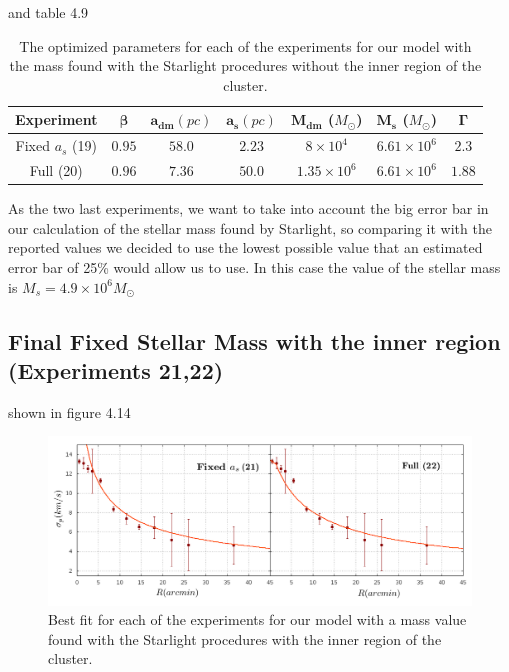 and table 4.9

\begin{table}[H]
\begin{center}
\begin{tabular}{| c| c| c| c| c| c| c|}
    \hline
    \textbf{Experiment} & $\mathbf{\beta}$ & $\mathbf{a_{dm}} (pc)$ & $\mathbf{a_{s}} (pc)$ & $\mathbf{M_{dm}}$ ($M_{\odot}$) & $\mathbf{M_{s}}$ ($M_{\odot}$) & $\mathbf{\Gamma}$\\ \hline
	Fixed $a_s$ (19) &	$0.95$ &	$58.0$ &	$2.23$ &	$8 \times 10^{4}$ &	$6.61 \times 10 ^{6}$ &	$2.3$\\ \hline
	Full (20) &	$0.96$ &	$7.36$ &	$50.0$ &	$1.35 \times 10^{6}$ &	$6.61 \times 10^{6}$ &	$1.88$\\ \hline
  \end{tabular} 
\caption[Optimized parameters for our model with the mass found with the Starlight procedures without the inner region.]{The optimized parameters for each of the experiments for our model with the mass found with the Starlight procedures without the inner region of the cluster.}
\end{center}
\end{table}


As the two last experiments, we want to take into account the big error bar in our calculation of the stellar mass found by Starlight, so comparing it with the reported values we decided to use the lowest possible value that an estimated error bar of 25\% would allow us to use. In this case the value of the stellar mass is $M_{s}=4.9 \times 10^{6} M_{\odot}$

\subsection{Final Fixed Stellar Mass with the inner region (Experiments 21,22)}

shown in figure 4.14

\begin{figure}[H]
\centering
\includegraphics[width=15cm]{images/Starlight_25_12.png}
\caption[Best fits for our model with a mass value based on the Starlight procedures with the inner region.]{Best fit for each of the experiments for our model with a mass value found with the Starlight procedures with the inner region of the cluster.}
\end{figure}

